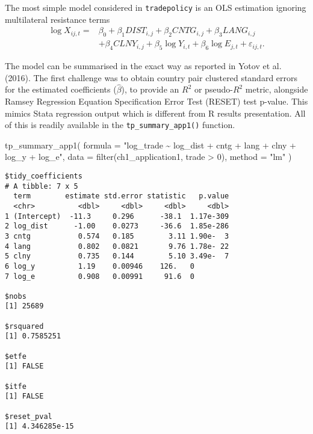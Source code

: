 \documentclass[12pt,reqno,oneside,pdftex]{formato-puc/puctesis} %
\newenvironment{Shaded}{\begin{snugshade}}{\end{snugshade}}
\newcommand{\AttributeTok}[1]{\textcolor[rgb]{0.77,0.63,0.00}{#1}}
\newcommand{\DecValTok}[1]{\textcolor[rgb]{0.00,0.00,0.81}{#1}}
\newcommand{\FunctionTok}[1]{\textcolor[rgb]{0.00,0.00,0.00}{#1}}
\newcommand{\NormalTok}[1]{#1}
\newcommand{\SpecialCharTok}[1]{\textcolor[rgb]{0.00,0.00,0.00}{#1}}
\newcommand{\StringTok}[1]{\textcolor[rgb]{0.31,0.60,0.02}{#1}}
\begin{document}
The most simple model considered in \texttt{tradepolicy} is an OLS
estimation ignoring multilateral resistance terms \begin{align*}
\log X_{ij,t} =& \beta_0 + \beta_1 DIST_{i,j} + \beta_2 CNTG_{i,j} + \beta_3 LANG_{i,j}\\ 
\text{ }& + \beta_4 CLNY_{i,j} + \beta_5 \log Y_{i,t} + \beta_6 \log E_{j,t} + \varepsilon_{ij,t}.
\end{align*}

The model can be summarised in the exact way as reported in Yotov et al.
(2016). The first challenge was to obtain country pair clustered
standard errors for the estimated coefficients (\(\hat{\beta}\)), to
provide an \(R^2\) or pseudo-\(R^2\) metric, alongside Ramsey Regression
Equation Specification Error Test (RESET) test p-value. This mimics
Stata regression output which is different from R results presentation.
All of this is readily available in the \texttt{tp\_summary\_app1()}
function.

\begin{Shaded}
\begin{Highlighting}[]
\FunctionTok{tp\_summary\_app1}\NormalTok{(}
  \AttributeTok{formula =} \StringTok{"log\_trade \textasciitilde{} log\_dist + cntg + lang + clny + log\_y + log\_e"}\NormalTok{,}
  \AttributeTok{data =} \FunctionTok{filter}\NormalTok{(ch1\_application1, trade }\SpecialCharTok{\textgreater{}} \DecValTok{0}\NormalTok{),}
  \AttributeTok{method =} \StringTok{"lm"}
\NormalTok{)}
\end{Highlighting}
\end{Shaded}

\begin{verbatim}
$tidy_coefficients
# A tibble: 7 x 5
  term        estimate std.error statistic   p.value
  <chr>          <dbl>     <dbl>     <dbl>     <dbl>
1 (Intercept)  -11.3     0.296      -38.1  1.17e-309
2 log_dist      -1.00    0.0273     -36.6  1.85e-286
3 cntg           0.574   0.185        3.11 1.90e-  3
4 lang           0.802   0.0821       9.76 1.78e- 22
5 clny           0.735   0.144        5.10 3.49e-  7
6 log_y          1.19    0.00946    126.   0        
7 log_e          0.908   0.00991     91.6  0        

$nobs
[1] 25689

$rsquared
[1] 0.7585251

$etfe
[1] FALSE

$itfe
[1] FALSE

$reset_pval
[1] 4.346285e-15
\end{verbatim}
\end{document}
